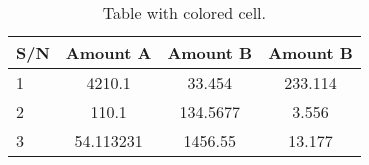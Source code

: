 \documentclass{article}
\begin{document}
    	
    	\begin{table}[h!]
    		\begin{center}
    			\caption{Table with colored cell.}
    			\label{tab:table 1}
    			\begin{tabular}{|l|S|S|c|}
    				\hline
    				\textbf{S/N} & \textbf{Amount A} & \textbf{Amount B} & \textbf{Amount B}\\
    				\hline
    				1 & 4210.1 & 33.454 & 233.114\\
    				2 & 110.1 & 134.5677 & 3.556\\
    				3 & 54.113231 & 1456.55 & 13.177\\
    				\hline	
    			\end{tabular}
    		\end{center}
    	\end{table}
    
    
\end{document}
